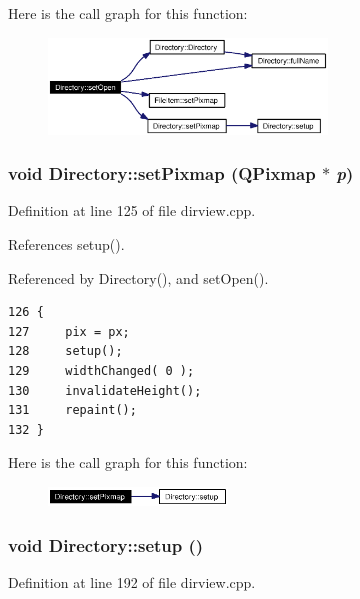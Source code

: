 Here is the call graph for this function:\begin{figure}[H]
\begin{center}
\leavevmode
\includegraphics[width=210pt]{classDirectory_Directorya5_cgraph}
\end{center}
\end{figure}
\subsubsection{\setlength{\rightskip}{0pt plus 5cm}void Directory::set\-Pixmap (QPixmap $\ast$ {\em p})}\label{classDirectory_Directorya8}




Definition at line 125 of file dirview.cpp.

References setup().

Referenced by Directory(), and set\-Open().



\footnotesize\begin{verbatim}126 {
127     pix = px;
128     setup();
129     widthChanged( 0 );
130     invalidateHeight();
131     repaint();
132 }
\end{verbatim}\normalsize 


Here is the call graph for this function:\begin{figure}[H]
\begin{center}
\leavevmode
\includegraphics[width=135pt]{classDirectory_Directorya8_cgraph}
\end{center}
\end{figure}
\subsubsection{\setlength{\rightskip}{0pt plus 5cm}void Directory::setup ()}\label{classDirectory_Directorya6}




Definition at line 192 of file dirview.cpp.

